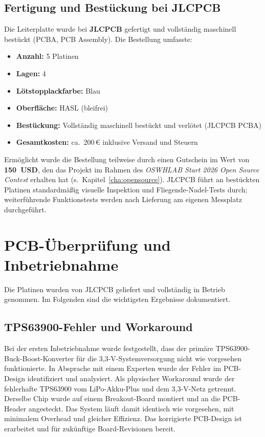 \newpage

\subsection*{Fertigung und Bestückung bei JLCPCB}

Die Leiterplatte wurde bei \textbf{JLCPCB} gefertigt und vollständig maschinell bestückt (PCBA, PCB Assembly). Die Bestellung umfasste:

\begin{itemize}
  \item \textbf{Anzahl:} 5 Platinen
  \item \textbf{Lagen:} 4
  \item \textbf{Lötstopplackfarbe:} Blau
  \item \textbf{Oberfläche:} HASL (bleifrei)
  \item \textbf{Bestückung:} Vollständig maschinell bestückt und verlötet (JLCPCB PCBA)
  \item \textbf{Gesamtkosten:} ca.\ 200\,€ inklusive Versand und Steuern
\end{itemize}

Ermöglicht wurde die Bestellung teilweise durch einen Gutschein im Wert von \textbf{150~USD}, den das Projekt im Rahmen des \textit{OSWHLAB Start 2026 Open Source Contest} erhalten hat (s.\ Kapitel~\ref{cha:opensource}). JLCPCB führt an bestückten Platinen standardmäßig visuelle Inspektion und Fliegende-Nadel-Tests durch; weiterführende Funktionstests werden nach Lieferung am eigenen Messplatz durchgeführt.

\section*{PCB-Überprüfung und Inbetriebnahme}
\label{sec:pcb-review}

Die Platinen wurden von JLCPCB geliefert und vollständig in Betrieb genommen. Im Folgenden sind die wichtigsten Ergebnisse dokumentiert.

\subsection*{TPS63900-Fehler und Workaround}

Bei der ersten Inbetriebnahme wurde festgestellt, dass der primäre TPS63900-Buck-Boost-Konverter für die 3,3-V-Systemversorgung nicht wie vorgesehen funktionierte. In Absprache mit einem Experten wurde der Fehler im PCB-Design identifiziert und analysiert. Als physischer Workaround wurde der fehlerhafte TPS63900 vom LiPo-Akku-Plus und dem 3,3-V-Netz getrennt. Derselbe Chip wurde auf einem Breakout-Board montiert und an die PCB-Header angesteckt. Das System läuft damit identisch wie vorgesehen, mit minimalem Overhead und gleicher Effizienz. Das korrigierte PCB-Design ist erarbeitet und für zukünftige Board-Revisionen bereit.


